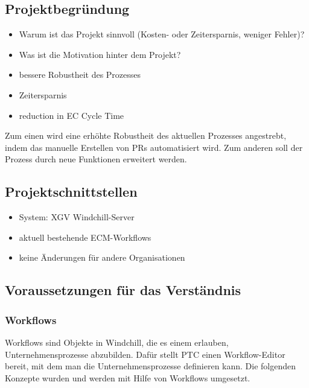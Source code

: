 \subsection{Projektbegründung} 
\label{sec:Projektbegruendung}
\begin{itemize} %
	\item Warum ist das Projekt sinnvoll (\zB Kosten- oder Zeitersparnis, weniger Fehler)?
	\item Was ist die Motivation hinter dem Projekt?
\end{itemize}
\begin{itemize}
	\item bessere Robustheit des Prozesses
	\item Zeitersparnis
	\item reduction in EC Cycle Time
\end{itemize}
Zum einen wird eine erhöhte Robustheit des aktuellen Prozesses angestrebt, indem das manuelle Erstellen von \acp{PR} automatisiert wird.
Zum anderen soll der Prozess durch neue Funktionen erweitert werden.

\subsection{Projektschnittstellen}
\label{sec:Projektschnittstellen}
\begin{itemize}
	\item System: \ac{XGV} Windchill-Server
	\item aktuell bestehende \ac{ECM}-Workflows
	\item keine Änderungen für andere Organisationen
\end{itemize}

\subsection{Voraussetzungen für das Verständnis}
\label{subsec:VerstaendnisVoraussetzungen}

\subsubsection{Workflows}
Workflows sind Objekte in Windchill, die es einem erlauben, Unternehmensprozesse abzubilden.
Dafür stellt \ac{PTC} einen Workflow-Editor bereit, mit dem man die Unternehmensprozesse definieren kann.
Die folgenden Konzepte wurden und werden mit Hilfe von Workflows umgesetzt.

